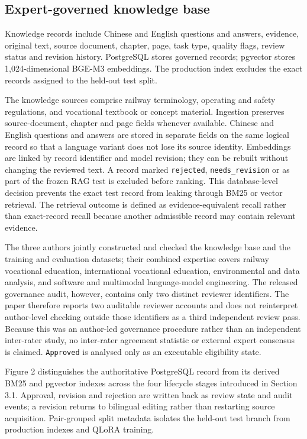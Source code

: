 \subsection{Expert-governed knowledge base}

Knowledge records include Chinese and English questions and answers, evidence, original text, source document, chapter, page, task type, quality flags, review status and revision history. PostgreSQL stores governed records; pgvector stores 1,024-dimensional BGE-M3 embeddings. The production index excludes the exact records assigned to the held-out test split.

The knowledge sources comprise railway terminology, operating and safety regulations, and vocational textbook or concept material. Ingestion preserves source-document, chapter and page fields whenever available. Chinese and English questions and answers are stored in separate fields on the same logical record so that a language variant does not lose its source identity. Embeddings are linked by record identifier and model revision; they can be rebuilt without changing the reviewed text. A record marked \texttt{rejected}, \texttt{needs\_revision} or as part of the frozen RAG test is excluded before ranking. This database-level decision prevents the exact test record from leaking through BM25 or vector retrieval. The retrieval outcome is defined as evidence-equivalent recall rather than exact-record recall because another admissible record may contain relevant evidence.

The three authors jointly constructed and checked the knowledge base and the training and evaluation datasets; their combined expertise covers railway vocational education, international vocational education, environmental and data analysis, and software and multimodal language-model engineering. The released governance audit, however, contains only two distinct reviewer identifiers. The paper therefore reports two auditable reviewer accounts and does not reinterpret author-level checking outside those identifiers as a third independent review pass. Because this was an author-led governance procedure rather than an independent inter-rater study, no inter-rater agreement statistic or external expert consensus is claimed. \texttt{Approved} is analysed only as an executable eligibility state.

Figure 2 distinguishes the authoritative PostgreSQL record from its derived BM25 and pgvector indexes across the four lifecycle stages introduced in Section 3.1. Approval, revision and rejection are written back as review state and audit events; a revision returns to bilingual editing rather than restarting source acquisition. Pair-grouped split metadata isolates the held-out test branch from production indexes and QLoRA training.

